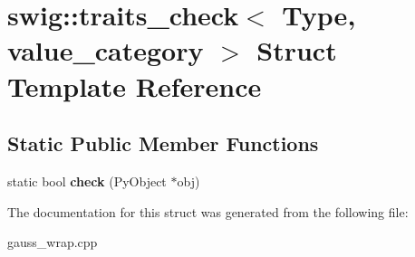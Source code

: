 \hypertarget{structswig_1_1traits__check_3_01_type_00_01value__category_01_4}{\section{swig\-:\-:traits\-\_\-check$<$ Type, value\-\_\-category $>$ Struct Template Reference}
\label{structswig_1_1traits__check_3_01_type_00_01value__category_01_4}
}
\subsection*{Static Public Member Functions}
\begin{DoxyCompactItemize}
\item 
\hypertarget{structswig_1_1traits__check_3_01_type_00_01value__category_01_4_a7b6a0811d1ac4cb4038c2eb8305411d0}{static bool {\bfseries check} (Py\-Object $\ast$obj)}\label{structswig_1_1traits__check_3_01_type_00_01value__category_01_4_a7b6a0811d1ac4cb4038c2eb8305411d0}

\end{DoxyCompactItemize}


The documentation for this struct was generated from the following file\-:\begin{DoxyCompactItemize}
\item 
gauss\-\_\-wrap.\-cpp\end{DoxyCompactItemize}
